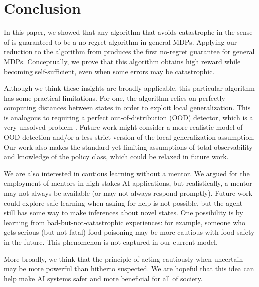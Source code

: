\section{Conclusion}

In this paper, we showed that any algorithm that avoids catastrophe in the sense of \citet{plaut_avoiding_2024} is guaranteed to be a no-regret algorithm in general MDPs. Applying our reduction to the algorithm from \citet{plaut_avoiding_2024} produces the first no-regret guarantee for general MDPs. Conceptually, we prove that this algorithm obtains high reward while becoming self-sufficient, even when some errors may be catastrophic.

Although we think these insights are broadly applicable, this particular algorithm has some practical limitations. For one, the algorithm relies on perfectly computing distances between states in order to exploit local generalization. This is analogous to requiring a perfect out-of-distribution (OOD) detector, which is a very unsolved problem \citep{yang2024generalized}. Future work might consider a more realistic model of OOD detection and/or a less strict version of the local generalization assumption. Our work also makes the standard yet limiting assumptions of total observability and knowledge of the policy class, which could be relaxed in future work.


We are also interested in cautious learning without a mentor. We argued for the employment of mentors in high-stakes AI applications, but realistically, a mentor may not always be available (or may not always respond promptly). Future work could explore safe learning when asking for help is not possible, but the agent still has some way to make inferences about novel states. One possibility is by learning from bad-but-not-catastrophic experiences: for example, someone who gets serious (but not fatal) food poisoning may be more cautious with food safety in the future. This phenomenon is not captured in our current model.


More broadly, we think that the principle of acting cautiously when uncertain may be more powerful than hitherto suspected. We are hopeful that this idea can help make AI systems safer and more beneficial for all of society.


